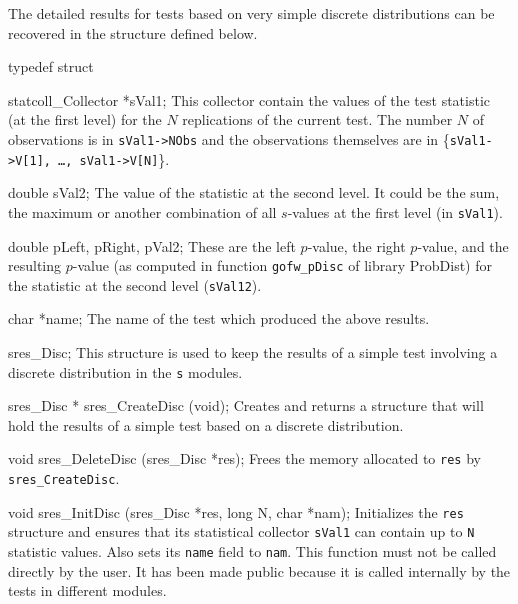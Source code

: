 
The detailed results for tests based on very simple discrete
distributions can be recovered in the structure defined below.

\code

typedef struct {

   statcoll_Collector *sVal1;
\endcode
 \tabb
  This collector contain the values of the test statistic
  (at the first level) for the $N$ replications of the current
  test. The number $N$ of observations is in {\tt sVal1->NObs} and the
  observations themselves are in \{{\tt sVal1->V[1], \ldots, sVal1->V[N]}\}.
 \endtabb
\code

   double sVal2;
\endcode
 \tabb
  The value of the statistic at the second level. It could be the sum,
  the maximum or another combination of all $s$-values at the first
  level (in  {\tt sVal1}).
 \endtabb
\code

   double pLeft, pRight, pVal2;
\endcode
 \tabb
  These are the left $p$-value, the right $p$-value, and the resulting
  $p$-value (as computed in function {\tt gofw\_pDisc} of library
  ProbDist) for the statistic at the second level ({\tt sVal12}).
 \endtabb
\code

   char *name;
\endcode
 \tabb
  The name of the test which produced the above results.
 \endtabb
\code

} sres_Disc;
\endcode
 \tab
  This structure is used to keep the results of a simple
  test involving a discrete distribution in the {\tt s} modules.
 \endtab
\code


sres_Disc * sres_CreateDisc (void);
\endcode
 \tab
  Creates and returns a structure that will hold the results
  of a simple test based on a discrete distribution.
 \endtab
\code


void sres_DeleteDisc (sres_Disc *res);
\endcode
 \tab
  Frees the memory allocated to {\tt res} by {\tt sres\_CreateDisc}.
 \endtab
\code


void sres_InitDisc (sres_Disc *res, long N, char *nam);
\endcode
 \tab
   Initializes the {\tt res} structure and ensures that its statistical
   collector {\tt sVal1} can contain up to  {\tt N} statistic values.
   Also sets its  {\tt name} field to  {\tt nam}.
   This function must not be called
   directly by the user. It has been made public because it is called
   internally by the tests in different modules.
 \endtab



